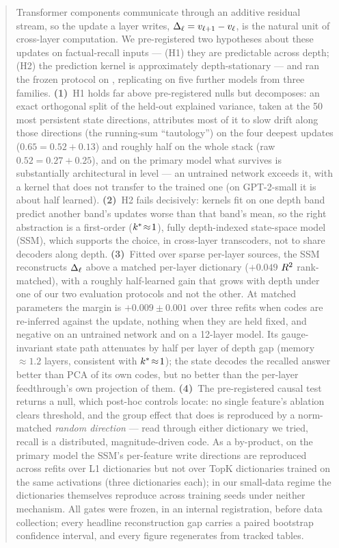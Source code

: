 \begin{abstract}
Transformer components communicate through an additive residual stream, so
the update a layer writes, $\Dl = v_{\ell+1} - \vl$, is the natural unit of
cross-layer computation. We pre-registered two hypotheses about these updates
on factual-recall inputs --- (H1) they are predictable across depth; (H2) the
prediction kernel is approximately depth-stationary --- and ran the frozen
protocol on \pythia{}, replicating on five further models from three families.
\textbf{(1)}~H1 holds far above pre-registered nulls but decomposes: an exact
orthogonal split of the held-out explained variance, taken at the 50 most
persistent state directions, attributes most of it to slow drift along those
directions (the running-sum ``tautology'') on the four deepest updates
($0.65 = 0.52 + 0.13$) and roughly half on the whole stack
(raw $0.52 = 0.27 + 0.25$), and on the primary model
what survives is substantially architectural in level --- an untrained network
exceeds it, with a kernel that does not transfer to the trained one (on
GPT-2-small it is about half learned).
\textbf{(2)}~H2 fails decisively: kernels fit on one depth band predict
another band's updates worse than that band's mean, so the right abstraction
is a first-order ($\kstar\!\approx\!1$), fully depth-indexed state-space
model (SSM), which supports the choice, in cross-layer transcoders, not to
share decoders along depth. \textbf{(3)}~Fitted over sparse per-layer
sources, the SSM
reconstructs $\Dl$ above a matched per-layer dictionary ($+0.049$ $\Rsq$
rank-matched), with a roughly half-learned gain that grows with depth under
one of our two evaluation protocols and not the other. At matched parameters
the margin is $+0.009 \pm 0.001$ over three refits when codes are re-inferred
against the update, nothing when they are held fixed, and negative on an
untrained network and on a 12-layer model. Its gauge-invariant state path
attenuates by half per layer of depth gap (memory ${\approx}1.2$ layers,
consistent with $\kstar\!\approx\!1$); the state decodes the recalled answer
better than PCA of its own codes, but no better than the per-layer
feedthrough's own projection of them.
\textbf{(4)}~The pre-registered causal test returns a null, which post-hoc
controls locate: no single feature's ablation clears threshold, and the group
effect that does is reproduced by a norm-matched \emph{random direction} ---
read through either dictionary we tried, recall is a distributed,
magnitude-driven code. As a by-product, on the primary model
the SSM's per-feature write directions are reproduced across refits over L1
dictionaries but not over TopK dictionaries trained on the same activations
(three dictionaries each); in our small-data regime the dictionaries
themselves reproduce across training seeds under neither mechanism. All gates were
frozen, in an internal registration, before data collection; every headline
reconstruction gap carries a
paired bootstrap confidence interval, and every figure regenerates from tracked
tables.
\end{abstract}
